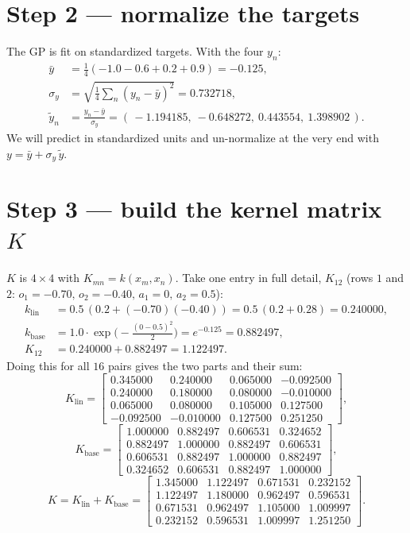 \documentclass[11pt]{article}
\begin{document}
\section{Step 2 --- normalize the targets}

The GP is fit on standardized targets. With the four $y_n$:
\begin{align}
\bar y&=\tfrac14(-1.0-0.6+0.2+0.9)=-0.125,\\
\sigma_y&=\sqrt{\tfrac14\!\sum_n (y_n-\bar y)^2}=0.732718,\\
\tilde y_n&=\frac{y_n-\bar y}{\sigma_y}
=(\,-1.194185,\ -0.648272,\ 0.443554,\ 1.398902\,).
\end{align}
We will predict in standardized units and un-normalize at the very end with
$y=\bar y+\sigma_y\,\tilde y$.

\section{Step 3 --- build the kernel matrix \texorpdfstring{$K$}{K}}

$K$ is $4\times4$ with $K_{mn}=k(x_m,x_n)$. Take one entry in full detail,
$K_{12}$ (rows $1$ and $2$: $o_1=-0.70,\,o_2=-0.40,\,a_1=0,\,a_2=0.5$):
\begin{align}
k_{\mathrm{lin}}&=0.5\,(0.2+(-0.70)(-0.40))=0.5\,(0.2+0.28)=0.240000,\\
k_{\mathrm{base}}&=1.0\cdot\exp\!\Big(-\tfrac{(0-0.5)^2}{2}\Big)=e^{-0.125}=0.882497,\\
K_{12}&=0.240000+0.882497=1.122497 .
\end{align}
Doing this for all $16$ pairs gives the two parts and their sum:
\begin{equation}
K_{\mathrm{lin}}=
\begin{bmatrix}
0.345000 & 0.240000 & 0.065000 & -0.092500\\
0.240000 & 0.180000 & 0.080000 & -0.010000\\
0.065000 & 0.080000 & 0.105000 & 0.127500\\
-0.092500 & -0.010000 & 0.127500 & 0.251250
\end{bmatrix},
\end{equation}
\begin{equation}
K_{\mathrm{base}}=
\begin{bmatrix}
1.000000 & 0.882497 & 0.606531 & 0.324652\\
0.882497 & 1.000000 & 0.882497 & 0.606531\\
0.606531 & 0.882497 & 1.000000 & 0.882497\\
0.324652 & 0.606531 & 0.882497 & 1.000000
\end{bmatrix},
\end{equation}
\begin{equation}
K=K_{\mathrm{lin}}+K_{\mathrm{base}}=
\begin{bmatrix}
1.345000 & 1.122497 & 0.671531 & 0.232152\\
1.122497 & 1.180000 & 0.962497 & 0.596531\\
0.671531 & 0.962497 & 1.105000 & 1.009997\\
0.232152 & 0.596531 & 1.009997 & 1.251250
\end{bmatrix}.
\end{equation}
\end{document}
